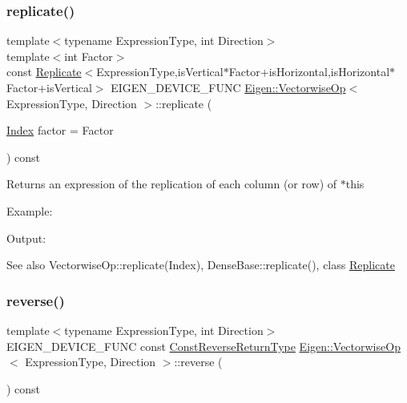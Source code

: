 \subsubsection{\texorpdfstring{replicate()}{replicate()}\hspace{0.1cm}{\footnotesize\ttfamily [2/2]}}
{\footnotesize\ttfamily template$<$typename Expression\+Type, int Direction$>$ \\
template$<$int Factor$>$ \\
const \mbox{\hyperlink{class_eigen_1_1_replicate}{Replicate}}$<$Expression\+Type,is\+Vertical$\ast$Factor+is\+Horizontal,is\+Horizontal$\ast$Factor+is\+Vertical$>$ E\+I\+G\+E\+N\+\_\+\+D\+E\+V\+I\+C\+E\+\_\+\+F\+U\+NC \mbox{\hyperlink{class_eigen_1_1_vectorwise_op}{Eigen\+::\+Vectorwise\+Op}}$<$ Expression\+Type, Direction $>$\+::replicate (\begin{DoxyParamCaption}\item[{\mbox{\hyperlink{class_eigen_1_1_vectorwise_op_a4907c654e5810edd98e4162093b19532}{Index}}}]{factor = {\ttfamily Factor} }\end{DoxyParamCaption}) const\hspace{0.3cm}{\ttfamily [inline]}}

\begin{DoxyReturn}{Returns}
an expression of the replication of each column (or row) of {\ttfamily $\ast$this} 
\end{DoxyReturn}
Example\+: 
\begin{DoxyCodeInclude}{0}
\end{DoxyCodeInclude}
 Output\+: 
\begin{DoxyVerbInclude}
\end{DoxyVerbInclude}


\begin{DoxySeeAlso}{See also}
Vectorwise\+Op\+::replicate(\+Index), Dense\+Base\+::replicate(), class \mbox{\hyperlink{class_eigen_1_1_replicate}{Replicate}} 
\end{DoxySeeAlso}
\mbox{\label{class_eigen_1_1_vectorwise_op_a058b821b65e2e27839853d9a25b0216c}} 
\subsubsection{\texorpdfstring{reverse()}{reverse()}\hspace{0.1cm}{\footnotesize\ttfamily [1/2]}}
{\footnotesize\ttfamily template$<$typename Expression\+Type, int Direction$>$ \\
E\+I\+G\+E\+N\+\_\+\+D\+E\+V\+I\+C\+E\+\_\+\+F\+U\+NC const \mbox{\hyperlink{class_eigen_1_1_reverse}{Const\+Reverse\+Return\+Type}} \mbox{\hyperlink{class_eigen_1_1_vectorwise_op}{Eigen\+::\+Vectorwise\+Op}}$<$ Expression\+Type, Direction $>$\+::reverse (\begin{DoxyParamCaption}{ }\end{DoxyParamCaption}) const\hspace{0.3cm}{\ttfamily [inline]}}

